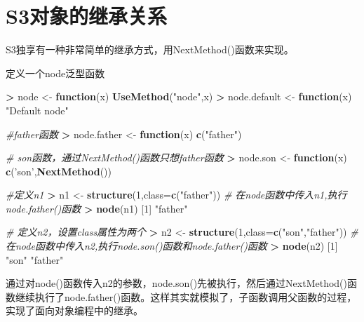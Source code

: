 \documentclass[]{book}
\newenvironment{Shaded}{\begin{snugshade}}{\end{snugshade}}
\newcommand{\KeywordTok}[1]{\textcolor[rgb]{0.13,0.29,0.53}{\textbf{#1}}}
\newcommand{\DataTypeTok}[1]{\textcolor[rgb]{0.13,0.29,0.53}{#1}}
\newcommand{\DecValTok}[1]{\textcolor[rgb]{0.00,0.00,0.81}{#1}}
\newcommand{\StringTok}[1]{\textcolor[rgb]{0.31,0.60,0.02}{#1}}
\newcommand{\CommentTok}[1]{\textcolor[rgb]{0.56,0.35,0.01}{\textit{#1}}}
\newcommand{\ControlFlowTok}[1]{\textcolor[rgb]{0.13,0.29,0.53}{\textbf{#1}}}
\newcommand{\OperatorTok}[1]{\textcolor[rgb]{0.81,0.36,0.00}{\textbf{#1}}}
\newcommand{\NormalTok}[1]{#1}
\begin{document}
\section{S3对象的继承关系}\label{s3}

S3独享有一种非常简单的继承方式，用NextMethod()函数来实现。

定义一个node泛型函数

\begin{Shaded}
\begin{Highlighting}[]
\OperatorTok{>}\StringTok{ }\NormalTok{node <-}\StringTok{ }\ControlFlowTok{function}\NormalTok{(x) }\KeywordTok{UseMethod}\NormalTok{(}\StringTok{"node"}\NormalTok{,x)}
\OperatorTok{>}\StringTok{ }\NormalTok{node.default <-}\StringTok{ }\ControlFlowTok{function}\NormalTok{(x) }\StringTok{"Default node"}

\CommentTok{#father函数}
\OperatorTok{>}\StringTok{ }\NormalTok{node.father <-}\StringTok{ }\ControlFlowTok{function}\NormalTok{(x) }\KeywordTok{c}\NormalTok{(}\StringTok{"father"}\NormalTok{)}

\CommentTok{# son函数，通过NextMethod()函数只想father函数}
\OperatorTok{>}\StringTok{ }\NormalTok{node.son <-}\StringTok{ }\ControlFlowTok{function}\NormalTok{(x) }\KeywordTok{c}\NormalTok{(}\StringTok{'son'}\NormalTok{,}\KeywordTok{NextMethod}\NormalTok{())}

\CommentTok{#定义n1}
\OperatorTok{>}\StringTok{ }\NormalTok{n1 <-}\StringTok{ }\KeywordTok{structure}\NormalTok{(}\DecValTok{1}\NormalTok{,}\DataTypeTok{class=}\KeywordTok{c}\NormalTok{(}\StringTok{"father"}\NormalTok{))}
\CommentTok{# 在node函数中传入n1,执行node.father()函数}
\OperatorTok{>}\StringTok{ }\KeywordTok{node}\NormalTok{(n1)}
\NormalTok{[}\DecValTok{1}\NormalTok{] }\StringTok{"father"}

\CommentTok{# 定义n2，设置class属性为两个}
\OperatorTok{>}\StringTok{ }\NormalTok{n2 <-}\StringTok{ }\KeywordTok{structure}\NormalTok{(}\DecValTok{1}\NormalTok{,}\DataTypeTok{class=}\KeywordTok{c}\NormalTok{(}\StringTok{"son"}\NormalTok{,}\StringTok{"father"}\NormalTok{))}
\CommentTok{# 在node函数中传入n2,执行node.son()函数和node.father()函数}
\OperatorTok{>}\StringTok{ }\KeywordTok{node}\NormalTok{(n2)}
\NormalTok{[}\DecValTok{1}\NormalTok{] }\StringTok{"son"} \StringTok{"father"}
\end{Highlighting}
\end{Shaded}

通过对node()函数传入n2的参数，node.son()先被执行，然后通过NextMethod()函数继续执行了node.father()函数。这样其实就模拟了，子函数调用父函数的过程，实现了面向对象编程中的继承。
\end{document}
